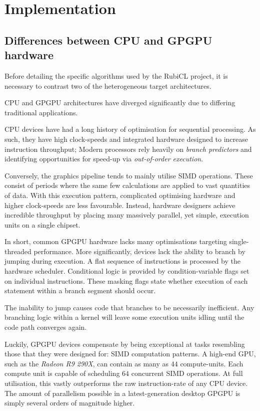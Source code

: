 \chapter{Implementation}
\section{Differences between CPU and GPGPU hardware}
Before detailing the specific algorithms  used by the RubiCL project, it is necessary to contrast two of the heterogeneous target architectures.

\ac{CPU} and \ac{GPGPU} architectures have diverged significantly due to differing traditional applications.

\ac{CPU} devices have had a long history of optimisation for sequential processing. As such, they have high clock-speeds and integrated hardware designed to increase instruction throughput; Modern processors rely heavily on \emph{branch predictors} and identifying opportunities for speed-up via \emph{out-of-order execution}.

Conversely, the graphics pipeline tends to mainly utilise \ac{SIMD} operations. These consist of periods where the same few calculations are applied to vast quantities of data. With this execution pattern, complicated optimising hardware and higher clock-speeds are less favourable. Instead, hardware designers achieve incredible throughput by placing many massively parallel, yet simple, execution units on a single chipset.

In short, common \ac{GPGPU} hardware lacks many optimisations targeting single-threaded performance. More significantly, devices lack the ability to branch by jumping during execution. A flat sequence of instructions is processed by the hardware scheduler. Conditional logic is provided by condition-variable flags set on individual instructions. These masking flags state whether execution of each statement within a branch segment should occur.

The inability to jump causes code that branches to be necessarily inefficient. Any branching logic within a kernel will leave some execution units idling until the code path converges again.

Luckily, \ac{GPGPU} devices compensate by being exceptional at tasks resembling those that they were designed for: \ac{SIMD} computation patterns. A high-end \ac{GPU}, such as the \emph{Radeon R9 290X}, can contain as many as $44$ compute-units. Each compute unit is capable of scheduling $64$ concurrent \ac{SIMD} operations. At full utilisation, this vastly outperforms the raw instruction-rate of any \ac{CPU} device. The amount of parallelism possible in a latest-generation desktop \ac{GPGPU} is simply several orders of magnitude higher.

